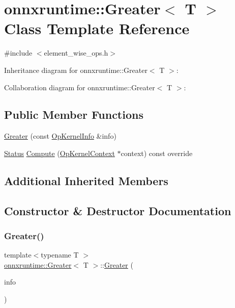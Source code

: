 \hypertarget{classonnxruntime_1_1Greater}{}\section{onnxruntime\+:\+:Greater$<$ T $>$ Class Template Reference}
\label{classonnxruntime_1_1Greater}


{\ttfamily \#include $<$element\+\_\+wise\+\_\+ops.\+h$>$}



Inheritance diagram for onnxruntime\+:\+:Greater$<$ T $>$\+:


Collaboration diagram for onnxruntime\+:\+:Greater$<$ T $>$\+:
\subsection*{Public Member Functions}
\begin{DoxyCompactItemize}
\item 
\mbox{\hyperlink{classonnxruntime_1_1Greater_a55fc389799efd3b9016adcdb24491151}{Greater}} (const \mbox{\hyperlink{classonnxruntime_1_1OpKernelInfo}{Op\+Kernel\+Info}} \&info)
\item 
\mbox{\hyperlink{classonnxruntime_1_1common_1_1Status}{Status}} \mbox{\hyperlink{classonnxruntime_1_1Greater_a75aedc5e96d027c0096747117d54667c}{Compute}} (\mbox{\hyperlink{classonnxruntime_1_1OpKernelContext}{Op\+Kernel\+Context}} $\ast$context) const override
\end{DoxyCompactItemize}
\subsection*{Additional Inherited Members}


\subsection{Constructor \& Destructor Documentation}
\mbox{\label{classonnxruntime_1_1Greater_a55fc389799efd3b9016adcdb24491151}} 
\subsubsection{\texorpdfstring{Greater()}{Greater()}}
{\footnotesize\ttfamily template$<$typename T $>$ \\
\mbox{\hyperlink{classonnxruntime_1_1Greater}{onnxruntime\+::\+Greater}}$<$ T $>$\+::\mbox{\hyperlink{classonnxruntime_1_1Greater}{Greater}} (\begin{DoxyParamCaption}\item[{const \mbox{\hyperlink{classonnxruntime_1_1OpKernelInfo}{Op\+Kernel\+Info}} \&}]{info }\end{DoxyParamCaption})\hspace{0.3cm}{\ttfamily [inline]}}



